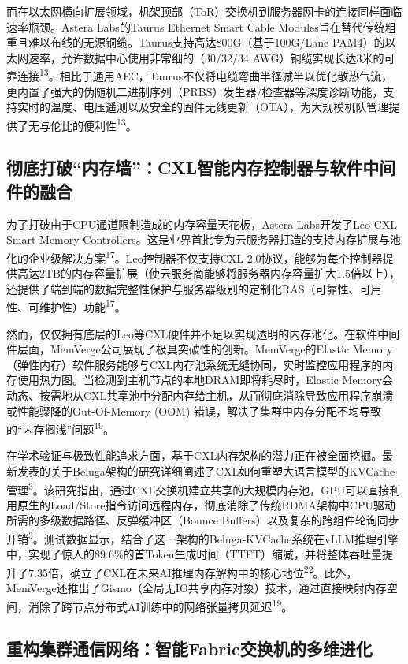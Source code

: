 而在以太网横向扩展领域，机架顶部（ToR）交换机到服务器网卡的连接同样面临速率瓶颈。Astera Labs的Taurus Ethernet Smart Cable Modules旨在替代传统粗重且难以布线的无源铜缆。Taurus支持高达800G（基于100G/Lane PAM4）的以太网速率，允许数据中心使用非常细的（30/32/34 AWG）铜缆实现长达3米的可靠连接\textsuperscript{13}。相比于通用AEC，Taurus不仅将电缆弯曲半径减半以优化散热气流，更内置了强大的伪随机二进制序列（PRBS）发生器/检查器等深度诊断功能，支持实时的温度、电压遥测以及安全的固件无线更新（OTA），为大规模机队管理提供了无与伦比的便利性\textsuperscript{13}。

\subsection{彻底打破``内存墙''：CXL智能内存控制器与软件中间件的融合}

为了打破由于CPU通道限制造成的内存容量天花板，Astera Labs开发了Leo CXL Smart Memory Controllers。这是业界首批专为云服务器打造的支持内存扩展与池化的企业级解决方案\textsuperscript{17}。Leo控制器不仅支持CXL 2.0协议，能够为每个控制器提供高达2TB的内存容量扩展（使云服务商能够将服务器内存容量扩大1.5倍以上），还提供了端到端的数据完整性保护与服务器级别的定制化RAS（可靠性、可用性、可维护性）功能\textsuperscript{17}。

然而，仅仅拥有底层的Leo等CXL硬件并不足以实现透明的内存池化。在软件中间件层面，MemVerge公司展现了极具突破性的创新。MemVerge的Elastic Memory（弹性内存）软件服务能够与CXL内存池系统无缝协同，实时监控应用程序的内存使用热力图。当检测到主机节点的本地DRAM即将耗尽时，Elastic Memory会动态、按需地从CXL共享池中分配内存给主机，从而彻底消除导致应用程序崩溃或性能骤降的Out-Of-Memory (OOM) 错误，解决了集群中内存分配不均导致的``内存搁浅''问题\textsuperscript{19}。

在学术验证与极致性能追求方面，基于CXL内存架构的潜力正在被全面挖掘。最新发表的关于Beluga架构的研究详细阐述了CXL如何重塑大语言模型的KVCache管理\textsuperscript{3}。该研究指出，通过CXL交换机建立共享的大规模内存池，GPU可以直接利用原生的Load/Store指令访问远程内存，彻底消除了传统RDMA架构中CPU驱动所需的多级数据路径、反弹缓冲区（Bounce Buffers）以及复杂的跨组件轮询同步开销\textsuperscript{3}。测试数据显示，结合了这一架构的Beluga-KVCache系统在vLLM推理引擎中，实现了惊人的89.6\%的首Token生成时间（TTFT）缩减，并将整体吞吐量提升了7.35倍，确立了CXL在未来AI推理内存解构中的核心地位\textsuperscript{22}。此外，MemVerge还推出了Gismo（全局无IO共享内存对象）技术，通过直接映射内存空间，消除了跨节点分布式AI训练中的网络张量拷贝延迟\textsuperscript{19}。

\subsection{重构集群通信网络：智能Fabric交换机的多维进化}

